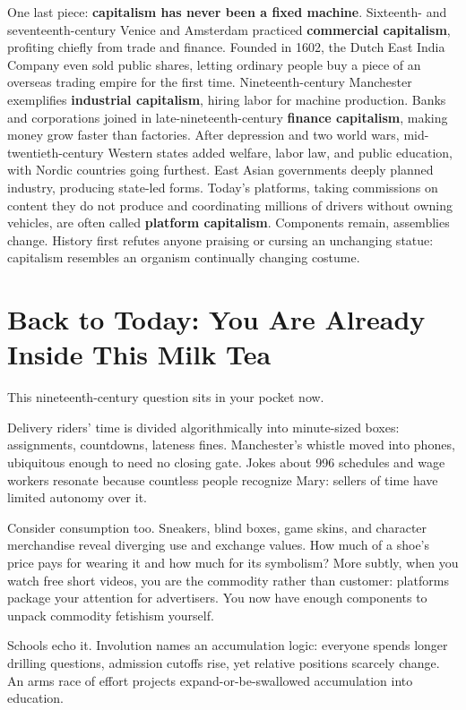 One last piece: \textbf{capitalism has never been a fixed machine}. Sixteenth- and seventeenth-century Venice and Amsterdam practiced \textbf{commercial capitalism}, profiting chiefly from trade and finance. Founded in 1602, the Dutch East India Company even sold public shares, letting ordinary people buy a piece of an overseas trading empire for the first time. Nineteenth-century Manchester exemplifies \textbf{industrial capitalism}, hiring labor for machine production. Banks and corporations joined in late-nineteenth-century \textbf{finance capitalism}, making money grow faster than factories. After depression and two world wars, mid-twentieth-century Western states added welfare, labor law, and public education, with Nordic countries going furthest. East Asian governments deeply planned industry, producing state-led forms. Today's platforms, taking commissions on content they do not produce and coordinating millions of drivers without owning vehicles, are often called \textbf{platform capitalism}. Components remain, assemblies change. History first refutes anyone praising or cursing an unchanging statue: capitalism resembles an organism continually changing costume.

\section[You Are Inside This Milk Tea]{Back to Today: You Are Already Inside This Milk Tea}
This nineteenth-century question sits in your pocket now.

Delivery riders' time is divided algorithmically into minute-sized boxes: assignments, countdowns, lateness fines. Manchester's whistle moved into phones, ubiquitous enough to need no closing gate. Jokes about 996 schedules and wage workers resonate because countless people recognize Mary: sellers of time have limited autonomy over it.

Consider consumption too. Sneakers, blind boxes, game skins, and character merchandise reveal diverging use and exchange values. How much of a shoe's price pays for wearing it and how much for its symbolism? More subtly, when you watch free short videos, you are the commodity rather than customer: platforms package your attention for advertisers. You now have enough components to unpack commodity fetishism yourself.

Schools echo it. Involution names an accumulation logic: everyone spends longer drilling questions, admission cutoffs rise, yet relative positions scarcely change. An arms race of effort projects expand-or-be-swallowed accumulation into education.

